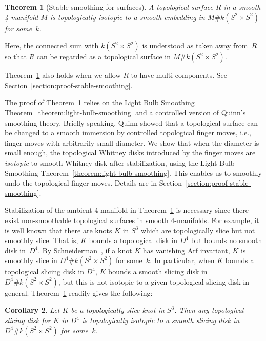 \documentclass[11pt]{amsart}
\newtheorem{theoremalpha}{Theorem}\def\thetheoremalpha{\Alph{theoremalpha}}
\newtheorem{corollaryalpha}[theoremalpha]{Corollary}\def\thecorollaryalpha{\Alph{corollaryalpha}}
\theoremstyle{definition}
\theoremstyle{theorem-giventitle}
\theoremstyle{definition-giventitle}
\numberwithin{equation}{section}
\begin{document}
\begin{theoremalpha}[Stable smoothing for surfaces]
  \label{theorem:stable-smoothing}
  \sloppy
  A topological surface $R$ in a smooth 4-manifold $M$ is topologically isotopic to a smooth embedding in $M\#k(S^{2}\times S^{2})$ for some~$k$.
\end{theoremalpha}

Here, the connected sum with $k(S^2\times S^2)$ is understood as taken away from~$R$ so that $R$ can be regarded as a topological surface in $M \# k(S^2\times S^2)$.

Theorem~\ref{theorem:stable-smoothing} also holds when we allow $R$ to have multi-components.
See Section~\ref{section:proof-stable-smoothing}.

The proof of Theorem~\ref{theorem:stable-smoothing} relies on the Light Bulb Smoothing Theorem~\ref{theorem:light-bulb-smoothing} and a controlled version of Quinn's smoothing theory.
Briefly speaking, Quinn showed that a topological surface can be changed to a smooth immersion by controlled topological finger moves, i.e., finger moves with arbitrarily small diameter.
We show that when the diameter is small enough, the topological Whitney disks introduced by the finger moves are \emph{isotopic} to smooth Whitney disk after stabilization, using the Light Bulb Smoothing Theorem~\ref{theorem:light-bulb-smoothing}\@.
This enables us to smoothly undo the topological finger moves.
Details are in Section~\ref{section:proof-stable-smoothing}.

Stabilization of the ambient 4-manifold in Theorem~\ref{theorem:stable-smoothing} is necessary since there exist non-smoothable topological surfaces in smooth 4-manifolds.
For example, it is well known that there are knots $K$ in $S^3$ which are topologically slice but not smoothly slice.
That is, $K$ bounds a topological disk in $D^4$ but bounds no smooth disk in~$D^4$.
By Schneiderman~\cite{Schneiderman:2010-1}, if a knot $K$ has vanishing Arf invariant, $K$ is smoothly slice in $D^4\# k(S^2\times S^2)$ for some~$k$.
In particular, when $K$ bounds a topological slicing disk in $D^4$, $K$ bounds a smooth slicing disk in $D^4\# k(S^2\times S^2)$, but this is not isotopic to a given topological slicing disk in general.
Theorem~\ref{theorem:stable-smoothing} readily gives the following:

\begin{corollaryalpha}
  \label{corollary:stable-smoothing-slice-disk}
  Let $K$ be a topologically slice knot in $S^3$.
  Then any topological slicing disk for $K$ in $D^4$ is topologically isotopic to a smooth slicing disk in $D^4\# k(S^2\times S^2)$ for some~$k$.
\end{corollaryalpha}
\end{document}
